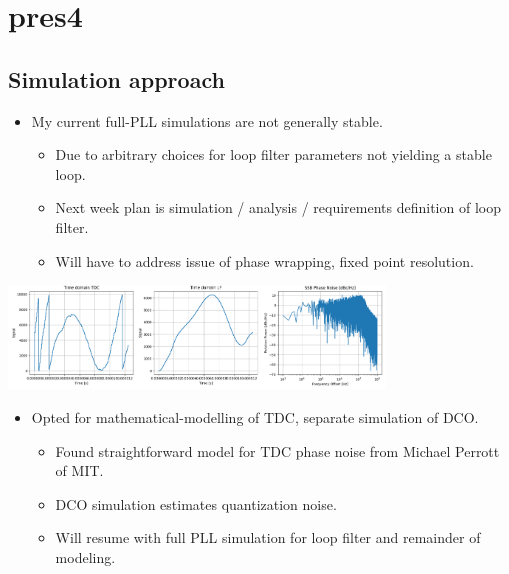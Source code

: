 \documentclass[10pt,a4paper]{article}
\begin{document}
	\section{pres4}
		\flushleft
		\subsection{Simulation approach}
		\vspace{-.2em}
		\begin{itemize}
			\footnotesize
			\item My current full-PLL simulations are not generally stable.
			\begin{itemize}
				\scriptsize
				\item Due to arbitrary choices for loop filter parameters not yielding a stable loop.				
				\item Next week plan is simulation / analysis / requirements definition of loop filter.
				\item Will have to address issue of phase wrapping, fixed point resolution.
			\end{itemize}
		\end{itemize} 	
		\vspace{-1.5em}
		\center\includegraphics[width=0.75\textwidth, angle=0]{figs/unstable2.png}
		\vspace{-0.5em}
		\begin{itemize}
			\footnotesize
			\item Opted for mathematical-modelling of TDC, separate simulation of DCO.
			\begin{itemize}
				\scriptsize
				\item Found straightforward model for TDC phase noise from Michael Perrott of MIT.
				\item DCO simulation estimates quantization noise.
				\item Will resume with full PLL simulation for loop filter and remainder of modeling.
			\end{itemize} 

		\end{itemize}  

		\flushleft  
\end{document}
